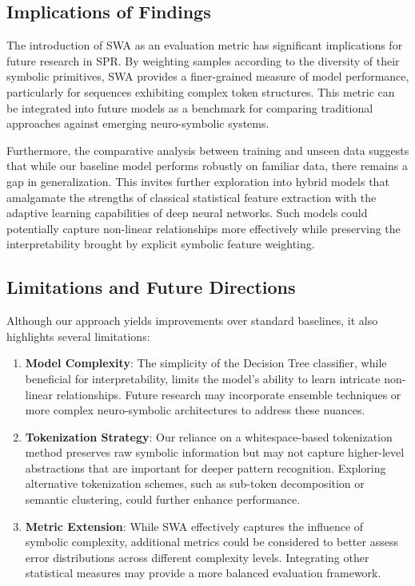 \documentclass{article}
\begin{document}
\subsection{Implications of Findings}
The introduction of SWA as an evaluation metric has significant implications for future research in SPR. By weighting samples according to the diversity of their symbolic primitives, SWA provides a finer-grained measure of model performance, particularly for sequences exhibiting complex token structures. This metric can be integrated into future models as a benchmark for comparing traditional approaches against emerging neuro-symbolic systems.

Furthermore, the comparative analysis between training and unseen data suggests that while our baseline model performs robustly on familiar data, there remains a gap in generalization. This invites further exploration into hybrid models that amalgamate the strengths of classical statistical feature extraction with the adaptive learning capabilities of deep neural networks. Such models could potentially capture non-linear relationships more effectively while preserving the interpretability brought by explicit symbolic feature weighting.

\subsection{Limitations and Future Directions}
Although our approach yields improvements over standard baselines, it also highlights several limitations:
\begin{enumerate}
    \item \textbf{Model Complexity}: The simplicity of the Decision Tree classifier, while beneficial for interpretability, limits the model's ability to learn intricate non-linear relationships. Future research may incorporate ensemble techniques or more complex neuro-symbolic architectures to address these nuances.
    \item \textbf{Tokenization Strategy}: Our reliance on a whitespace-based tokenization method preserves raw symbolic information but may not capture higher-level abstractions that are important for deeper pattern recognition. Exploring alternative tokenization schemes, such as sub-token decomposition or semantic clustering, could further enhance performance.
    \item \textbf{Metric Extension}: While SWA effectively captures the influence of symbolic complexity, additional metrics could be considered to better assess error distributions across different complexity levels. Integrating other statistical measures may provide a more balanced evaluation framework.
\end{enumerate}
\end{document}

